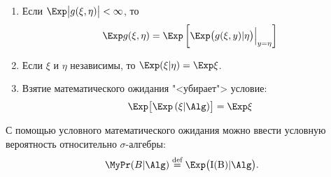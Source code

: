 \begin{namedthm}
\begin{enumerate}
\begin{proof}
\begin{equation*}
                        \Exp (\xi f(\eta) \cdot g(\eta))=\Exp (\xi h(\eta))=\Exp (\widehat{\xi} h(\eta))=\Exp (\zeta \cdot g(\eta))
                    \end{equation*}
                \end{proof}
        \fi
            \item 
                Если $\Exp \bigl| g(\xi, \eta) \bigr| <\infty$, то
                \begin{equation*}
                    \Exp g(\xi, \eta)=\Exp \left[\Bigl.\Exp \bigl(g(\xi, y) | \eta\bigr)\Bigr|_{y=\eta}\right]
                \end{equation*}
            \item 
                Если $\xi$ и $\eta$ независимы, то $\Exp (\xi | \eta)=\Exp \xi$.
            \item
                Взятие математического ожидания "<убирает"> условие:
                \begin{equation*}
                    \Exp \bigl[ \Exp \left(\xi | \Alg \right)\bigr] = \Exp \xi
                \end{equation*}                
        \end{enumerate}
    \end{namedthm}
    С помощью условного математического ожидания можно ввести условную вероятность относительно $\sigma$-алгебры:
    \begin{equation*}
        \MyPr(B | \Alg) \overset{\text{def}}{=} \Exp \bigl(\rm{I}(B) | \Alg \bigr).
    \end{equation*}

\iffalse
